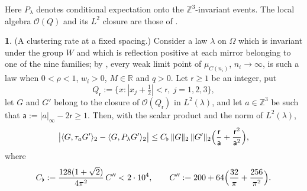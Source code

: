 \documentclass[11pt]{amsart}
\newcommand{\namedhead}{}
\theoremstyle{definition}
\newtheorem*{namedinner}{\namedhead}
\newenvironment{named}[1]{\renewcommand{\namedhead}{#1}\begin{namedinner}}{\end{namedinner}}
\begin{document}
Here $P_\lambda$ denotes conditional expectation onto the
$\mathbb Z^3$-invariant events. The local algebra $\mathcal O(Q)$ and
its $L^2$ closure are those of \cite[Section~10.1]{QEDII}.
\begin{named}{Proposition 5.17}
(A clustering rate at a fixed spacing.)
Consider a law $\lambda$ on $\Omega$ which is invariant under the group $W$ and which is reflection positive at each mirror belonging to one of the nine families; by \cite[Theorem~1.2]{QEDII}, every weak limit point of $\mu_{C(n_i)}$, $n_i\to\infty$, is such a law when $0<\rho<1$, $w_i>0$, $M\in\mathbb R$ and $q>0$.
Let $\mathsf r\ge1$ be an integer, put
\begin{equation*}
Q_{\mathsf r}:=\{x:|x_j+\tfrac12|<\mathsf r,\ j=1,2,3\},
\end{equation*}
let $G$ and $G'$ belong to the closure of $\mathcal O(Q_{\mathsf r})$ in $L^2(\lambda)$, and let $a\in\mathbb Z^3$ be such that $\mathsf a:=|a|_\infty-2\mathsf r\ge1$.
Then, with the scalar product and the norm of $L^2(\lambda)$,
\begin{equation*}
\bigl|\langle G,\tau_aG'\rangle_2-\langle G,P_\lambda G'\rangle_2\bigr|\le C_\flat\,\|G\|_2\,\|G'\|_2\Bigl(\frac{\mathsf r}{\mathsf a}+\frac{\mathsf r^2}{\mathsf a^2}\Bigr),
\end{equation*}
where
\begin{equation*}
C_\flat:=\frac{128(1+\sqrt2)}{4\pi^2}\,C''<2\cdot10^4,\qquad C'':=200+64\Bigl(\frac{32}{\pi}+\frac{256}{\pi^2}\Bigr).
\end{equation*}
\end{named}
\end{document}
